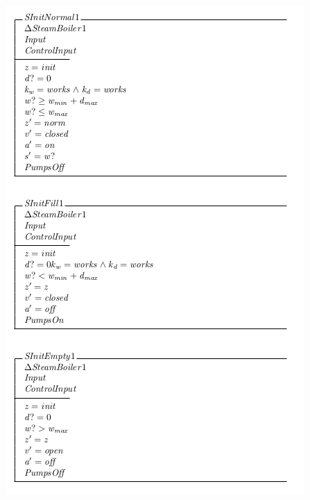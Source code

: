 \begin{center}
    \noindent \includegraphics[scale=0.8]{examples/steamboiler/0f.png}
\end{center}

